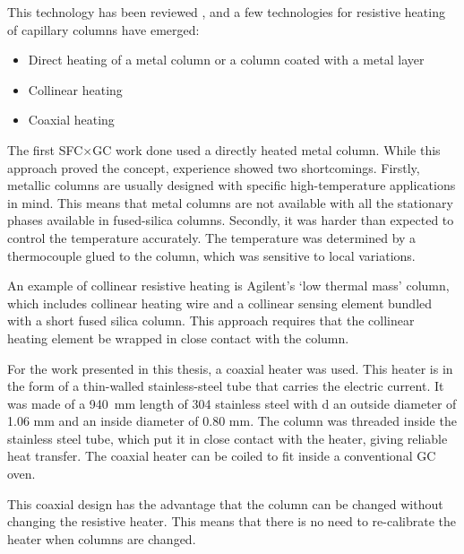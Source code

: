 This technology has been reviewed \autocite{Wang2012, Jacobs2013, Miranda2010},
and a few technologies for resistive heating of capillary columns have emerged:

\begin{itemize}
  \item Direct heating of a metal column or a column coated with a metal layer
  \item Collinear heating
  \item Coaxial heating
\end{itemize}

The first SFC×GC work done \autocite{Venter2004} used a directly heated metal
column. While this approach proved the concept, experience showed two
shortcomings. Firstly, metallic columns are usually designed with specific
high-temperature applications in mind. This means that metal columns are not
available with all the stationary phases available in fused-silica columns.
Secondly, it was harder than expected to control the temperature accurately. The
temperature was determined by a thermocouple glued to the column, which was
sensitive to local variations.

An example of collinear resistive heating is Agilent\texttrademark{}'s
`low thermal mass' column, which includes collinear heating wire and a collinear
sensing element bundled with a short fused silica column. This approach requires that
the collinear heating element be wrapped in close contact with the column.

For the work presented in this thesis, a coaxial heater was used. This heater is
in the form of a thin-walled stainless-steel tube that carries the electric
current. It was made of a \SI{940}{\milli\metre} length of 304 stainless steel
with d an outside diameter of 1.06 mm and an inside diameter of 0.80 mm. The
column was threaded inside the stainless steel tube, which put it in close
contact with the heater, giving reliable heat transfer. The coaxial heater can be
coiled to fit inside a conventional GC oven.

This coaxial design has the advantage that the column can be changed without
changing the resistive heater. This means that there is no need to re-calibrate
the heater when columns are changed.

